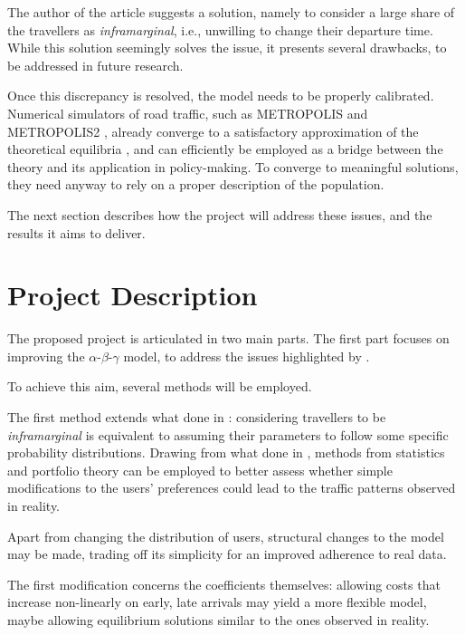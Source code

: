 \documentclass{article}
\begin{document}
The author of the article suggests a solution,
namely to consider a large share of the travellers as \textit{inframarginal},
i.e., unwilling to change their departure time.
While this solution seemingly solves the issue,
it presents several drawbacks, to be addressed in future research.

Once this discrepancy is resolved,
the model needs to be properly calibrated.
Numerical simulators of road traffic,
such as METROPOLIS and METROPOLIS2 \parencite{de1997metropolis,RePEc:ema:worpap:2024-03},
already converge to a satisfactory approximation of the theoretical equilibria
\parencite{RePEc:ema:worpap:2024-03},
and can efficiently be employed as a bridge between the theory and its application in policy-making.
To converge to meaningful solutions,
they need anyway to rely on a proper description of the population.

The next section describes how the project will address these issues,
and the results it aims to deliver.

\section{Project Description}
\label{sec:proj_desc}

The proposed project is articulated in two main parts.
The first part focuses on improving the \(\alpha\)-\(\beta\)-\(\gamma\) model,
to address the issues highlighted by \textcite{https://doi.org/10.1111/iere.12692}.

To achieve this aim, several methods will be employed.

The first method extends what done in \textcite{https://doi.org/10.1111/iere.12692}:
considering travellers to be \textit{inframarginal} is equivalent to assuming their
parameters to follow some specific probability distributions.
Drawing from what done in \textcite{amirgholy2017analytical},
methods from statistics and portfolio theory can be employed to better
assess whether simple modifications to the users' preferences could lead to
the traffic patterns observed in reality.

Apart from changing the distribution of users,
structural changes to the model may be made,
trading off its simplicity for an improved adherence to real data.

The first modification concerns the coefficients themselves:
allowing costs that increase non-linearly on early,
late arrivals may yield a more flexible model,
maybe allowing equilibrium solutions similar to the ones observed in reality.
\end{document}
